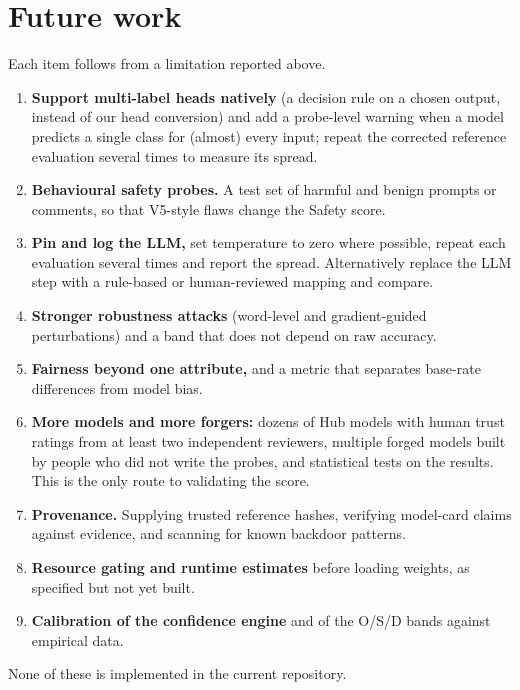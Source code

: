 \section{Future work}
Each item follows from a limitation reported above.
\begin{enumerate}
\item \textbf{Support multi-label heads natively} (a decision rule on a chosen output, instead of our head conversion) and add a probe-level warning when a model predicts a single class for (almost) every input; repeat the corrected reference evaluation several times to measure its spread.
\item \textbf{Behavioural safety probes.} A test set of harmful and benign prompts or comments, so that V5-style flaws change the Safety score.
\item \textbf{Pin and log the LLM,} set temperature to zero where possible, repeat each evaluation several times and report the spread. Alternatively replace the LLM step with a rule-based or human-reviewed mapping and compare.
\item \textbf{Stronger robustness attacks} (word-level and gradient-guided perturbations) and a band that does not depend on raw accuracy.
\item \textbf{Fairness beyond one attribute,} and a metric that separates base-rate differences from model bias.
\item \textbf{More models and more forgers:} dozens of Hub models with human trust ratings from at least two independent reviewers, multiple forged models built by people who did not write the probes, and statistical tests on the results. This is the only route to validating the score.
\item \textbf{Provenance.} Supplying trusted reference hashes, verifying model-card claims against evidence, and scanning for known backdoor patterns.
\item \textbf{Resource gating and runtime estimates} before loading weights, as specified but not yet built.
\item \textbf{Calibration of the confidence engine} and of the O/S/D bands against empirical data.
\end{enumerate}
None of these is implemented in the current repository.
